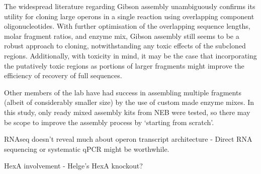 The widespread literature regarding Gibson assembly unambiguously confirms its utility for cloning large operons in a single reaction using overlapping component oligonucleotides. With further optimisation of the overlapping sequence lengths, molar fragment ratios, and enzyme mix, Gibson assembly still seems to be a robust approach to cloning, notwithstanding any toxic effects of the subcloned regions. Additionally, with toxicity in mind, it may be the case that incorporating the putatively toxic regions as portions of larger fragments might improve the efficiency of recovery of full sequences.

Other members of the lab have had success in assembling multiple fragments (albeit of considerably smaller size) by the use of custom made enzyme mixes. In this study, only ready mixed assembly kits from NEB were tested, so there may be scope to improve the assembly process by `starting from scratch'.


RNAseq doesn't reveal much about operon transcript architecture - Direct RNA sequencing or systematic qPCR might be worthwhile.

HexA involvement - Helge's HexA knockout?